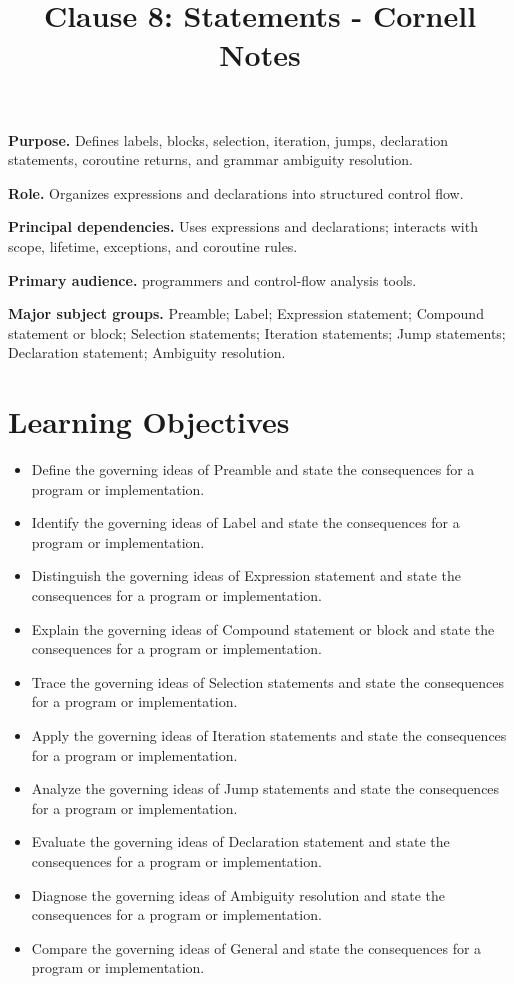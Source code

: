 \documentclass[11pt,letterpaper]{article}
\title{Clause 8: Statements - Cornell Notes}
\author{}
\date{}
\begin{document}
\maketitle
\begin{CornellReferenceOrientationBox}
\textbf{Purpose.} Defines labels, blocks, selection, iteration, jumps, declaration statements, coroutine returns, and grammar ambiguity resolution.
\par\textbf{Role.} Organizes expressions and declarations into structured control flow.
\par\textbf{Principal dependencies.} Uses expressions and declarations; interacts with scope, lifetime, exceptions, and coroutine rules.
\par\textbf{Primary audience.} programmers and control-flow analysis tools.
\par\textbf{Major subject groups.} Preamble; Label; Expression statement; Compound statement or block; Selection statements; Iteration statements; Jump statements; Declaration statement; Ambiguity resolution.
\end{CornellReferenceOrientationBox}
\section{Learning Objectives}
\begin{itemize}[label=\textcolor{CornellReferenceTeal}{$\blacktriangleright$}]
\item Define the governing ideas of Preamble and state the consequences for a program or implementation.
\item Identify the governing ideas of Label and state the consequences for a program or implementation.
\item Distinguish the governing ideas of Expression statement and state the consequences for a program or implementation.
\item Explain the governing ideas of Compound statement or block and state the consequences for a program or implementation.
\item Trace the governing ideas of Selection statements and state the consequences for a program or implementation.
\item Apply the governing ideas of Iteration statements and state the consequences for a program or implementation.
\item Analyze the governing ideas of Jump statements and state the consequences for a program or implementation.
\item Evaluate the governing ideas of Declaration statement and state the consequences for a program or implementation.
\item Diagnose the governing ideas of Ambiguity resolution and state the consequences for a program or implementation.
\item Compare the governing ideas of General and state the consequences for a program or implementation.
\end{itemize}
\end{document}
